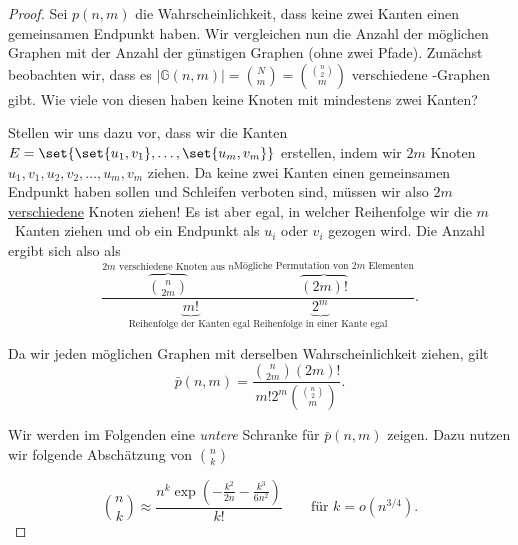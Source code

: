 \begin{proof}
    Sei $p(n,m)$ die Wahrscheinlichkeit, dass keine zwei Kanten einen gemeinsamen Endpunkt haben.
    Wir vergleichen nun die Anzahl der möglichen Graphen mit der Anzahl der günstigen Graphen (\dh ohne zwei Pfade).
    Zunächst beobachten wir, dass es $|\mathbb G(n,m)| = \binom N m = \binom{\binom n 2}{m}$ verschiedene \Gnm-Graphen gibt.
    Wie viele von diesen haben keine Knoten mit mindestens zwei Kanten?

    Stellen wir uns dazu vor, dass wir die Kanten $E = \set{\set{u_1, v_1}, \ldots, \set{u_m, v_m}}$ erstellen, indem wir $2m$ Knoten $u_1, v_1, u_2, v_2, \ldots, u_m, v_m$ ziehen.
    Da keine zwei Kanten einen gemeinsamen Endpunkt haben sollen und Schleifen verboten sind, müssen wir also $2m$ \underline{verschiedene} Knoten ziehen!
    Es ist aber egal, in welcher Reihenfolge wir die $m$~Kanten ziehen und ob ein Endpunkt als $u_i$ oder $v_i$ gezogen wird.
    Die Anzahl ergibt sich also als
    \begin{equation}
        \frac{
            \overbrace{\binom{n}{2m}}^\text{$2m$ verschiedene Knoten aus $n$}
            \overbrace{(2m)!}^\text{Mögliche Permutation von $2m$ Elementen}
        }{
            \underbrace{m!}_\text{Reihenfolge der Kanten egal\ \ \ }
            \underbrace{2^m}_\text{Reihenfolge in einer Kante egal}
        }.
    \end{equation}

    \noindent
    Da wir jeden möglichen Graphen mit derselben Wahrscheinlichkeit ziehen, gilt
    \begin{equation}
        \bar p(n, m) = \frac{\binom{n}{2m} (2m)!}{m! 2^m \binom{\binom n 2}{m}}. \label{eq:wkeit_keine_zwei_kanten}
    \end{equation}

    \noindent
    Wir werden im Folgenden eine \emph{untere} Schranke für $\bar p(n,m)$ zeigen.
    Dazu nutzen wir folgende Abschätzung von $\binom n k$

    \begin{equation}
        \binom n k \approx \frac{n^k \exp\left(-\frac{k^2}{2n} - \frac{k^3}{6n^2}\right)}{k!}
        \quad\quad \text{für } k = o(n^{3/4}).
    \end{equation}


\end{proof}
